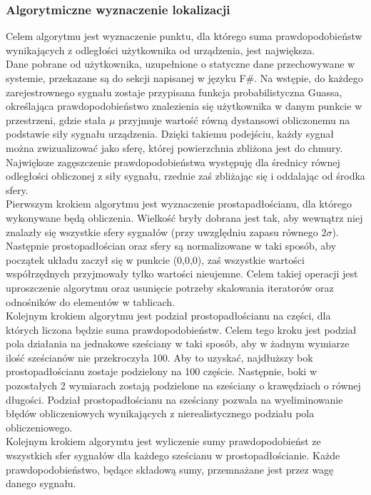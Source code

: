 \subsubsection{Algorytmiczne wyznaczenie lokalizacji}
Celem algorytmu jest wyznaczenie punktu, dla którego suma prawdopodobieństw wynikających z odległości użytkownika od urządzenia, jest największa.\\
Dane pobrane od użytkownika, uzupełnione o statyczne dane przechowywane w systemie, przekazane są do sekcji napisanej w języku F\#. Na wstępie, do każdego zarejestrownego sygnału zostaje przypisana funkcja probabilistyczna Guassa, określająca prawdopodobieństwo znalezienia się użytkownika w danym punkcie w przestrzeni, gdzie stała $\mu$ przyjmuje wartość równą dystansowi obliczonemu na podstawie siły sygnału urządzenia. Dzięki takiemu podejściu, każdy sygnał można zwizualizować jako sferę, której powierzchnia zbliżona jest do chmury. Największe zagęszczenie prawdopodobieństwa występuję dla średnicy równej odległości obliczonej z siły sygnału, rzednie zaś zbliżając się i oddalając od środka sfery.\\
Pierwszym krokiem algorytmu jest wyznaczenie prostapadłościanu, dla którego wykonywane będą obliczenia. Wielkość bryły dobrana jest tak, aby wewnątrz niej znalazły się wszystkie sfery sygnałów (przy uwzględniu zapasu równego 2$\sigma$). Następnie prostopadłościan oraz sfery są normalizowane w taki sposób, aby początek układu zaczył się w punkcie (0,0,0), zaś wszystkie wartości współrzędnych przyjmowały tylko wartości nieujemne. Celem takiej operacji jest uproszczenie algorytmu oraz usunięcie potrzeby skalowania iteratorów oraz odnośników do elementów w tablicach.\\
Kolejnym krokiem algorytmu jest podział prostopadłościanu na części, dla których liczona będzie suma prawdopodobieństw. Celem tego kroku jest podział pola działania na jednakowe sześciany w taki sposób, aby w żadnym wymiarze ilość sześcianów nie przekroczyła 100. Aby to uzyskać, najdłuższy bok prostopadłościanu zostaje podzielony na 100 częście. Następnie, boki w pozostałych 2 wymiarach zostają podzielone na sześciany o krawędziach o równej długości. Podział prostopadłościanu na sześciany pozwala na wyeliminowanie błędów obliczeniowych wynikających z nierealistycznego podziału pola obliczeniowego.\\
Kolejnym krokiem algorymtu jest wyliczenie sumy prawdopodobieńst ze wszystkich sfer sygnałów dla każdego sześcianu w prostopadłościanie. Każde prawdopodobieństwo, będące składową sumy, przemnażane jest przez wagę danego sygnału.		
